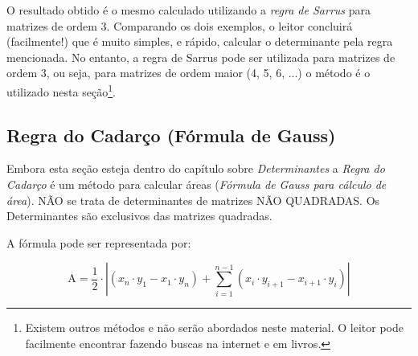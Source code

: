 O resultado obtido é o mesmo calculado utilizando a \textit{regra de Sarrus} para matrizes de ordem 3. Comparando os dois exemplos, o leitor concluirá (facilmente!) que é muito simples, e rápido, calcular o determinante pela regra mencionada. No entanto, a regra de Sarrus pode ser utilizada para matrizes de ordem 3, ou seja, para matrizes de ordem maior (4, 5, 6, ...) o método é o utilizado nesta seção\footnote{Existem outros métodos e não serão abordados neste material. O leitor pode facilmente encontrar fazendo buscas na internet e em livros.}.

\subsection{Regra do Cadarço (Fórmula de Gauss)}

Embora esta seção esteja dentro do capítulo sobre \textit{Determinantes} a \textit{Regra do Cadarço} é um método para calcular áreas (\textit{Fórmula de Gauss para cálculo de área}).
NÃO se trata de determinantes de matrizes NÃO QUADRADAS. Os Determinantes são exclusivos das matrizes quadradas.

A fórmula pode ser representada por:

$$
\mathrm{A}=\frac{1}{2}\cdot|(x_{n}\cdot y_{1}-x_{1}\cdot y_{n})+\sum_{i=1}^{n-1}(x_{i}\cdot y_{i+1}-x_{i+1}\cdot y_{i})|
$$

